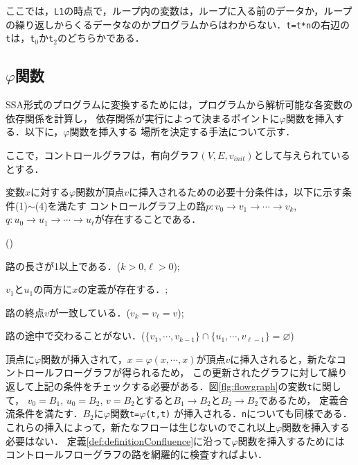 \documentclass[dvipdfmx,a4j]{jbook}
\begin{document}
ここでは，\verb|L1|の時点で，ループ内の変数は，ループに入る前のデータか，ループの繰り返しからくるデータなのかプログラムからはわからない．\verb|t=t*n|の右辺の\verb|t|は，\verb|t|$_0$か\verb|t|$_2$のどちらかである．

\subsection{$\varphi$関数}

SSA形式のプログラムに変換するためには，プログラムから解析可能な各変数の依存関係を計算し，
依存関係が実行によって決まるポイントに$\varphi$関数を挿入する．以下に，$\varphi$関数を挿入する
場所を決定する手法について示す．

ここで，コントロールグラフは，有向グラフ$(V,E,v_{init})$として与えられているとする．

\begin{Def}[定義合流条件]\label{def:definitionConfluence}
    変数$x$に対する$\varphi$関数が頂点$v$に挿入されるための必要十分条件は，以下に示す条件(1)$\sim$(4)を満たす
    コントロールグラフ上の路$p:v_0\rightarrow v_1\rightarrow\cdots\rightarrow v_k$,
    $q:u_0\rightarrow u_1\rightarrow\cdots\rightarrow u_\ell$が存在することである．
    \begin{list}{()}{}
        \item 路の長さが1以上である．($k>0$,$\ell>0$);
        \item $v_1$と$u_1$の両方に$x$の定義が存在する．;
        \item 路の終点$v$が一致している．($v_k=v_\ell=v$);
        \item 路の途中で交わることがない．($\{v_1,\cdots,v_{k-1}\}\cap\{u_1,\cdots,v_{\ell-1}\}=\varnothing$)
    \end{list}
\end{Def}

頂点に$\varphi$関数が挿入されて，$x=\varphi(x,\cdots,x)$が頂点$v$に挿入されると，新たなコントロールフローグラフが得られるため，
この更新されたグラフに対して繰り返して上記の条件をチェックする必要がある．図\ref{flg:flowgraph}の変数\verb|t|に関して，
$v_0=B_1$, $u_0=B_2$, $v=B_2$とすると$B_1\rightarrow B_2$と$B_2\rightarrow B_2$であるため，
定義合流条件を満たす．$B_2$に$\varphi$関数\verb|t=|$\varphi$\verb|(t,t)|
が挿入される．\verb|n|についても同様である．これらの挿入によって，新たなフローは生じないのでこれ以上$\varphi$関数を挿入する必要はない．
定義\ref{def:definitionConfluence}に沿って$\varphi$関数を挿入するためには
コントロールフローグラフの路を網羅的に検査すればよい．
\end{document}

